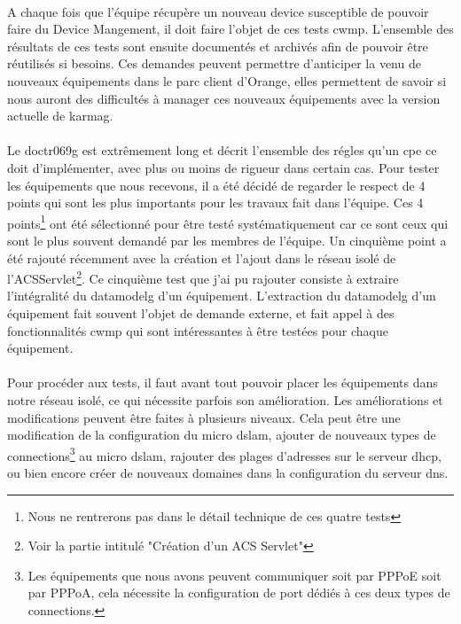 \documentclass[12pt,a4paper]{report}
\begin{document}
\paragraph*{}A chaque fois que l’équipe récupère un nouveau device susceptible de pouvoir faire du Device Mangement, il doit faire l’objet de ces tests \gls{cwmp}. L’ensemble des résultats de ces tests sont ensuite documentés et archivés afin de pouvoir être réutilisés si besoins. Ces demandes peuvent permettre d'anticiper la venu de nouveaux équipements dans le parc client d'Orange, elles permettent de savoir si nous auront des difficultés à manager ces nouveaux équipements avec la version actuelle de \gls{karmag}. 
\paragraph*{}Le \gls{doctr069g} est extrêmement long et décrit l'ensemble des régles qu’un \gls{cpe} ce doit d'implémenter, avec plus ou moins de rigueur dans certain cas. Pour tester les équipements que nous recevons, il a été décidé de regarder le respect de 4 points qui sont les plus importants pour les travaux fait dans l’équipe. Ces 4 points\footnote{Nous ne rentrerons pas dans le détail technique de ces quatre tests} ont été sélectionné pour être testé systématiquement car ce sont ceux qui sont le plus souvent demandé par les membres de l’équipe. Un cinquième point a été rajouté récemment avec la création et l’ajout dans le réseau isolé de l’ACSServlet\footnote{Voir la partie intitulé "Création d'un ACS Servlet"}. Ce cinquième test que j’ai pu rajouter consiste à extraire l’intégralité du {datamodelg} d’un équipement. L’extraction du {datamodelg} d’un équipement fait souvent l’objet de demande externe, et fait appel à des fonctionnalités \gls{cwmp} qui sont intéressantes à être testées pour chaque équipement.
\paragraph*{}Pour procéder aux tests, il faut avant tout pouvoir placer les équipements dans notre réseau isolé, ce qui nécessite parfois son amélioration. Les améliorations et modifications peuvent être faites à plusieurs niveaux. Cela peut être une modification de la configuration du micro \gls{dslam}, ajouter de nouveaux types de connections\footnote{Les équipements que nous avons peuvent communiquer soit par PPPoE soit par PPPoA, cela nécessite la configuration de port dédiés à ces deux types de connections.} au micro \gls{dslam}, rajouter des plages d’adresses sur le serveur \gls{dhcp}, ou bien encore créer de nouveaux domaines dans la configuration du serveur \gls{dns}.
\end{document}
